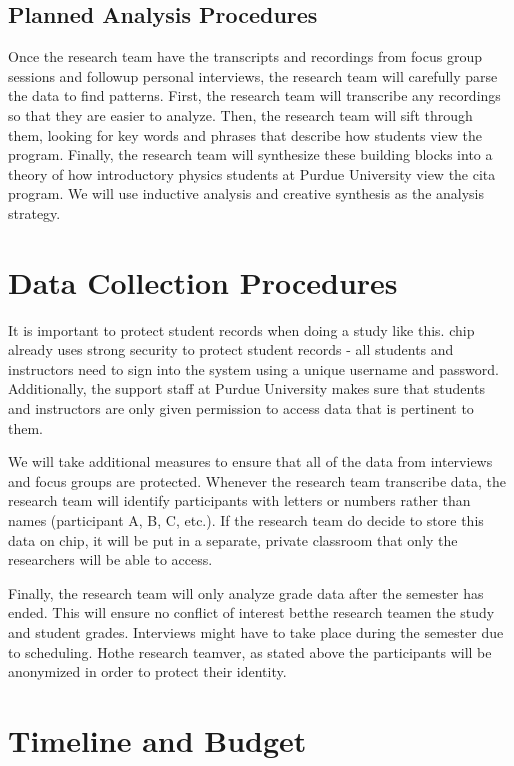 \subsection{Planned Analysis Procedures}

Once the research team have the transcripts and recordings from focus group sessions and followup personal interviews, the research team will carefully parse the data to find patterns. First, the research team will transcribe any recordings so that they are easier to analyze. Then, the research team will sift through them, looking for key words and phrases that describe how students view the program. Finally, the research team will synthesize these building blocks into a theory of how introductory physics students at Purdue University view the \gls{cita} program. We will use inductive analysis and creative synthesis as the analysis strategy.

\section{Data Collection Procedures}

It is important to protect student records when doing a study like this. \gls{chip} already uses strong security to protect student records - all students and instructors need to sign into the system using a unique username and password. Additionally, the support staff at Purdue University makes sure that students and instructors are only given permission to access data that is pertinent to them.

We will take additional measures to ensure that all of the data from interviews and focus groups are protected. Whenever the research team transcribe data, the research team will identify participants with letters or numbers rather than names (participant A, B, C, etc.). If the research team do decide to store this data on \gls{chip}, it will be put in a separate, private classroom that only the researchers will be able to access.

Finally, the research team will only analyze grade data after the semester has ended. This will ensure no conflict of interest betthe research teamen the study and student grades. Interviews might have to take place during the semester due to scheduling. Hothe research teamver, as stated above the participants will be anonymized in order to protect their identity.

\section{Timeline and Budget}

